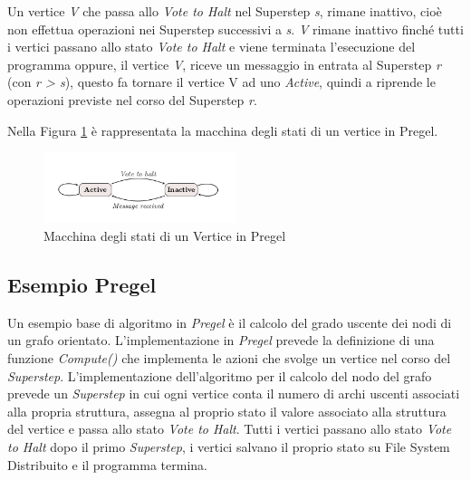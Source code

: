 \documentclass[LaM,binding=0.6cm]{sapthesis}
\begin{document}
Un vertice \textit{V} che passa allo \textit{Vote to Halt} nel Superstep \textit{s}, rimane inattivo, cioè non effettua operazioni nei Superstep successivi a \textit{s}. \textit{V} rimane inattivo finché tutti i vertici passano allo stato \textit{Vote to Halt} e viene terminata l’esecuzione del programma oppure, il vertice \textit{V},  riceve un messaggio in entrata al Superstep \textit{r} (con \textit{r > s}), questo fa tornare il vertice V ad uno \textit{Active}, quindi a riprende le operazioni previste nel corso del Superstep \textit{r}.

Nella Figura \ref{fig:msPregel} è rappresentata la macchina degli stati di un vertice in Pregel.

\begin{figure}
\centering
\includegraphics[width=0.5\textwidth]{macchinastatipregel}
\caption{Macchina degli stati di un Vertice in Pregel}
\label{fig:msPregel}
\end{figure}

\subsection{Esempio Pregel}
 
Un esempio base di algoritmo in \textit{Pregel }\cite{Malewicz:2010:PSL:1807167.1807184} è il calcolo del grado uscente dei nodi di un grafo orientato. 
L'implementazione in \textit{Pregel} prevede la definizione di una funzione \textit{Compute()} che implementa le azioni che svolge un vertice nel corso del \textit{Superstep}. L'implementazione dell'algoritmo per il calcolo del nodo del grafo prevede un \textit{Superstep} in cui ogni vertice conta il numero di archi uscenti associati alla propria struttura, assegna al proprio stato il valore associato alla struttura del vertice e passa allo stato \textit{Vote to Halt}.
Tutti i vertici passano allo stato \textit{Vote to Halt} dopo il primo \textit{Superstep}, i vertici salvano il proprio stato su File System Distribuito e il programma termina.

\begin{minipage}{\linewidth}

\end{minipage}
\end{document}

